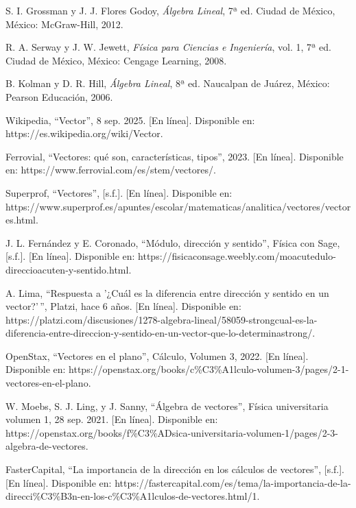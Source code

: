 \documentclass[conference]{IEEEtran}
\begin{document}
\begin{thebibliography}{20}

S. I. Grossman y J. J. Flores Godoy, \emph{Álgebra Lineal}, 7ª ed. Ciudad de México, México: McGraw-Hill, 2012.

R. A. Serway y J. W. Jewett, \emph{Física para Ciencias e Ingeniería}, vol. 1, 7ª ed. Ciudad de México, México: Cengage Learning, 2008.

B. Kolman y D. R. Hill, \emph{Álgebra Lineal}, 8ª ed. Naucalpan de Juárez, México: Pearson Educación, 2006.

Wikipedia, ``Vector'', 8 sep. 2025. [En línea]. Disponible en: https://es.wikipedia.org/wiki/Vector.

Ferrovial, ``Vectores: qué son, características, tipos'', 2023. [En línea]. Disponible en: https://www.ferrovial.com/es/stem/vectores/.

Superprof, ``Vectores'', [s.f.]. [En línea]. Disponible en: https://www.superprof.es/apuntes/escolar/matematicas/analitica/vectores/vectores.html.

J. L. Fernández y E. Coronado, ``Módulo, dirección y sentido'', Física con Sage, [s.f.]. [En línea]. Disponible en: https://fisicaconsage.weebly.com/moacutedulo-direccioacuten-y-sentido.html.

A. Lima, ``Respuesta a '¿Cuál es la diferencia entre dirección y sentido en un vector?'\,'', Platzi, hace 6 años. [En línea]. Disponible en: https://platzi.com/discusiones/1278-algebra-lineal/58059-strongcual-es-la-diferencia-entre-direccion-y-sentido-en-un-vector-que-lo-determinastrong/.

OpenStax, ``Vectores en el plano'', Cálculo, Volumen 3, 2022. [En línea]. Disponible en: https://openstax.org/books/c\%C3\%A1lculo-volumen-3/pages/2-1-vectores-en-el-plano.

W. Moebs, S. J. Ling, y J. Sanny, ``Álgebra de vectores'', Física universitaria volumen 1, 28 sep. 2021. [En línea]. Disponible en: https://openstax.org/books/f\%C3\%ADsica-universitaria-volumen-1/pages/2-3-algebra-de-vectores.

FasterCapital, ``La importancia de la dirección en los cálculos de vectores'', [s.f.]. [En línea]. Disponible en: https://fastercapital.com/es/tema/la-importancia-de-la-direcci\%C3\%B3n-en-los-c\%C3\%A1lculos-de-vectores.html/1.


\end{thebibliography}
\end{document}
